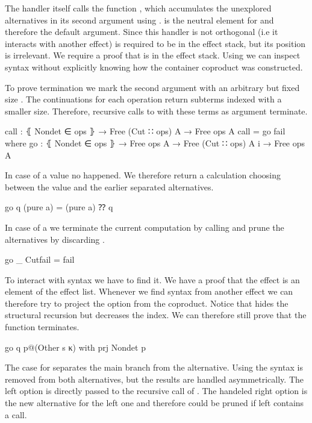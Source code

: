 \begin{AgdaAlign}
The handler itself calls the function , which accumulates the
unexplored alternatives in its second argument using .
 is the neutral element for  and therefore
the default argument.
Since this handler is not orthogonal (i.e it interacts with another effect)
 is required to be in the effect stack, but its position is
irrelevant.
We require a proof that  is in the effect stack.
Using  we can inspect  syntax without
explicitly knowing how the container coproduct was constructed.

To prove termination we mark the second argument with an arbitrary but fixed size
.
The continuations for each operation return subterms indexed with a smaller size.
Therefore, recursive calls to  with these terms as argument
terminate.

\begin{code}
call : ⦃ Nondet ∈ ops ⦄ → Free (Cut ∷ ops) A → Free ops A
call = go fail
  where
    go : ⦃ Nondet ∈ ops ⦄ → Free ops A → Free (Cut ∷ ops) A {i} → Free ops A
\end{code}
In case of a  value no 
happened.
We therefore return a calculation choosing between the value and the earlier
separated alternatives.

\begin{code}
    go q (pure a)       = (pure a) ⁇ q
\end{code}
In case of a  we terminate the current computation by calling
 and prune the alternatives by discarding .

\begin{code}
    go _ Cutfail        = fail
\end{code}
To interact with  syntax we have to find it.
We have a proof that the  effect is an element of the effect
list.
Whenever we find syntax from another effect we can therefore try to project the
 option from the coproduct.
Notice that  hides the structural recursion but decreases the
 index.
We can therefore still prove that the function terminates.

\begin{code}
    go q p@(Other s κ)  with prj {Nondet} p
\end{code}
The case for  separates the main branch from the alternative.
Using  the  syntax is removed from both
alternatives, but the results are handled asymmetrically.
The left option is directly passed to the recursive call of
.
The handeled right option is the new alternative for the left one and therefore
could be pruned if left contains a  call.


\end{AgdaAlign}
